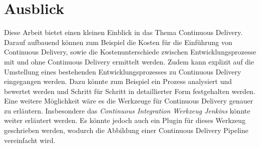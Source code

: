 \section{Ausblick}
\label{sec:Ausblick}
Diese Arbeit bietet einen kleinen Einblick in das Thema Continuous Delivery. Darauf aufbauend können zum Beispiel die Kosten für die Einführung von Continuous Delivery, sowie die Kostenunterschiede zwischen Entwicklungsprozesse mit und ohne Continuous Delivery ermittelt werden. Zudem kann explizit auf die Umstellung eines bestehenden Entwicklungsprozesses zu Continuous Delivery eingegangen werden. Dazu könnte zum Beispiel ein Prozess analysiert und bewertet werden und Schritt für Schritt in detaillierter Form festgehalten werden. Eine weitere Möglichkeit wäre es die Werkzeuge für Continuous Delivery genauer zu erläutern. Insbesondere das \textit{Continuous Integration Werkzeug Jenkins} könnte weiter erläutert werden. Es könnte jedoch auch ein Plugin für dieses Werkzeug geschrieben werden, wodurch die Abbildung einer Continuous Delivery Pipeline vereinfacht wird.